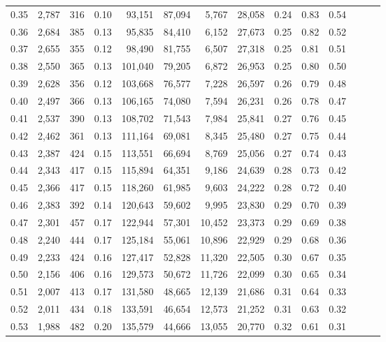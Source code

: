 \begin{tabular}{rrrrrrrrrrrrrr}
0.35 &  2,787 &    316 &  0.10 &   93,151 &   87,094 &   5,767 &  28,058 &  0.24 &  0.83 &      0.54 \\
0.36 &  2,684 &    385 &  0.13 &   95,835 &   84,410 &   6,152 &  27,673 &  0.25 &  0.82 &      0.52 \\
0.37 &  2,655 &    355 &  0.12 &   98,490 &   81,755 &   6,507 &  27,318 &  0.25 &  0.81 &      0.51 \\
0.38 &  2,550 &    365 &  0.13 &  101,040 &   79,205 &   6,872 &  26,953 &  0.25 &  0.80 &      0.50 \\
0.39 &  2,628 &    356 &  0.12 &  103,668 &   76,577 &   7,228 &  26,597 &  0.26 &  0.79 &      0.48 \\
0.40 &  2,497 &    366 &  0.13 &  106,165 &   74,080 &   7,594 &  26,231 &  0.26 &  0.78 &      0.47 \\
0.41 &  2,537 &    390 &  0.13 &  108,702 &   71,543 &   7,984 &  25,841 &  0.27 &  0.76 &      0.45 \\
0.42 &  2,462 &    361 &  0.13 &  111,164 &   69,081 &   8,345 &  25,480 &  0.27 &  0.75 &      0.44 \\
0.43 &  2,387 &    424 &  0.15 &  113,551 &   66,694 &   8,769 &  25,056 &  0.27 &  0.74 &      0.43 \\
0.44 &  2,343 &    417 &  0.15 &  115,894 &   64,351 &   9,186 &  24,639 &  0.28 &  0.73 &      0.42 \\
0.45 &  2,366 &    417 &  0.15 &  118,260 &   61,985 &   9,603 &  24,222 &  0.28 &  0.72 &      0.40 \\
0.46 &  2,383 &    392 &  0.14 &  120,643 &   59,602 &   9,995 &  23,830 &  0.29 &  0.70 &      0.39 \\
0.47 &  2,301 &    457 &  0.17 &  122,944 &   57,301 &  10,452 &  23,373 &  0.29 &  0.69 &      0.38 \\
0.48 &  2,240 &    444 &  0.17 &  125,184 &   55,061 &  10,896 &  22,929 &  0.29 &  0.68 &      0.36 \\
0.49 &  2,233 &    424 &  0.16 &  127,417 &   52,828 &  11,320 &  22,505 &  0.30 &  0.67 &      0.35 \\
0.50 &  2,156 &    406 &  0.16 &  129,573 &   50,672 &  11,726 &  22,099 &  0.30 &  0.65 &      0.34 \\
0.51 &  2,007 &    413 &  0.17 &  131,580 &   48,665 &  12,139 &  21,686 &  0.31 &  0.64 &      0.33 \\
0.52 &  2,011 &    434 &  0.18 &  133,591 &   46,654 &  12,573 &  21,252 &  0.31 &  0.63 &      0.32 \\
0.53 &  1,988 &    482 &  0.20 &  135,579 &   44,666 &  13,055 &  20,770 &  0.32 &  0.61 &      0.31 \\

\end{tabular}
